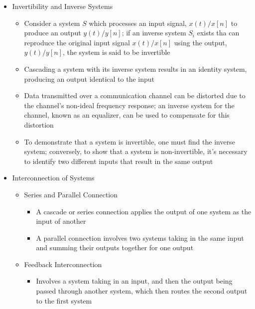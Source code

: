 \begin{itemize}
\begin{itemize}
    \end{itemize}

  \item Invertibility and Inverse Systems

    \begin{itemize}

      \item Consider a system $S$ which processes an input signal, $x(t)/x[n]$ to produce an output $y(t)/y[n]$; if an inverse system $S_i$ exists tha can reproduce the original input signal $x(t)/x[n]$ using the output, $y(t)/y[n]$, the system is said to be invertible

      \item Cascading a system with its inverse system results in an identity system, producing an output identical to the input

      \item Data transmitted over a communication channel can be distorted due to the channel's non-ideal frequency response; an inverse system for the channel, known as an equalizer, can be used to compensate for this distortion

      \item To demonstrate that a system is invertible, one must find the inverse system; conversely, to show that a system is non-invertible, it's necessary to identify two different inputs that result in the same output

    \end{itemize}

  \item Interconnection of Systems

    \begin{itemize}

      \item Series and Parallel Connection

        \begin{itemize}

          \item A cascade or series connection applies the output of one system as the input of another

          \item A parallel connection involves two systems taking in the same input and summing their outputs together for one output

        \end{itemize}

      \item Feedback Interconnection

        \begin{itemize}

          \item Involves a system taking in an input, and then the output being passed through another system, which then routes the second output to the first system

        \end{itemize}

    \end{itemize}

\end{itemize}



